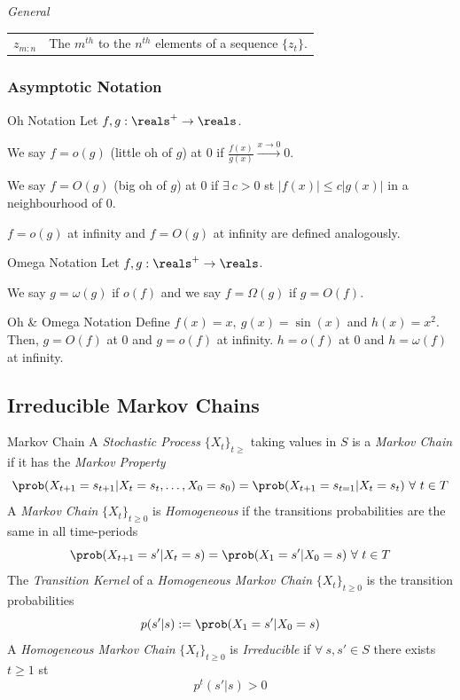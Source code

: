 \documentclass[11pt,a4paper]{article}
\begin{document}
  \textit{General}\\
  \begin{tabular}{|c|l|}
    \hline
    $z_{m:n}$&The $m^{th}$ to the $n^{th}$ elements of a sequence $\{z_t\}$.
    \hline
  \end{tabular}

\subsubsection{Asymptotic Notation}

  \begin{definition}{Oh Notation}
    Let $f,g:\reals^+\to\reals$.
    \par We say $f=o(g)$ (little oh of $g$) at 0 if $\frac{f(x)}{g(x)}\overset{x\to0}\longrightarrow0$.
    \par We say $f=O(g)$ (big oh of $g$) at 0 if $\exists\ c>0$ st $|f(x)|\leq c|g(x)|$ in a neighbourhood of 0.
    \par $f=o(g)$ at infinity and $f=O(g)$ at infinity are defined analogously.
  \end{definition}

  \begin{definition}{Omega Notation}
    Let $f,g:\reals^+\to\reals$.
    \par We say $g=\omega(g)$ if $o(f)$ and we say $f=\Omega(g)$ if $g=O(f)$.
  \end{definition}

  \begin{example}{Oh \& Omega Notation}
    Define $f(x)=x,\ g(x)=\sin(x)$ and $h(x)=x^2$.\\
    Then, $g=O(f)$ at 0 and $g=o(f)$ at infinity. $h=o(f)$ at 0 and $h=\omega(f)$ at infinity.
  \end{example}

\subsection{Irreducible Markov Chains}

  \begin{definition}{Markov Chain}
    A \textit{Stochastic Process} $\{X_t\}_{t\geq}$ taking values in $S$ is a \textit{Markov Chain} if it has the \textit{Markov Property}
    \[ \prob(X_{t+1}=s_{t+1}|X_t=s_t,\dots,X_0=s_0)=\prob(X_{t+1}=s_{t=1}|X_t=s_t)\ \forall\ t\in T \]
    A \textit{Markov Chain} $\{X_t\}_{t\geq0}$ is \textit{Homogeneous} if the transitions probabilities are the same in all time-periods
    \[ \prob(X_{t+1}=s'|X_t=s)=\prob(X_1=s'|X_0=s)\ \forall\ t\in T \]
    The \textit{Transition Kernel} of a \textit{Homogeneous Markov Chain} $\{X_t\}_{t\geq0}$ is the transition probabilities
    \[ p(s'|s):=\prob(X_1=s'|X_0=s) \]
    A \textit{Homogeneous Markov Chain} $\{X_t\}_{t\geq0}$ is \textit{Irreducible} if $\forall\ s,s'\in S$ there exists $t\geq 1$ st
    \[ p^t(s'|s)>0 \]
  \end{definition}
\end{document}
